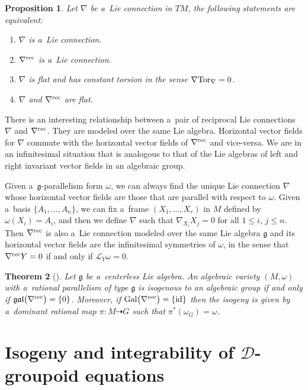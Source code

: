 \documentclass[10pt,a4paper]{amsart}
\numberwithin{equation}{section}
\newtheorem{Theorem}{Theorem}[section]
\newtheorem{Proposition}[Theorem]{Proposition}
\theoremstyle{definition}
\begin{document}
\begin{Proposition}
Let $\nabla$ be a~Lie connection in $TM$, the following statements are equivalent:
\begin{enumerate}\itemsep=0pt
 \item[$(1)$] $\nabla$ is a~Lie connection.
 \item[$(2)$] $\nabla^{\rm rec}$ is a~Lie connection.
 \item[$(3)$] $\nabla$ is flat and has constant torsion in the sense $\nabla {\rm Tor}_\nabla = 0$.
 \item[$(4)$] $\nabla$ and $\nabla^{\rm rec}$ are flat.
\end{enumerate}
\end{Proposition}

There is an interesting relationship between a~pair of reciprocal Lie connections $\nabla$ and $\nabla^{\rm rec}$. They are modeled over the same Lie algebra. Horizontal vector fields for $\nabla$ commute with the horizontal vector fields of $\nabla^{\rm rec}$ and vice-versa. We are in an infinitesimal situation that is analogous to that of the Lie algebras of left and right invariant vector fields in an algebraic group.

Given a~$\mathfrak g$-parallelism form $\omega$, we can always find the unique Lie connection $\nabla$ whose horizontal vector fields are those that are parallel with respect to $\omega$. Given a~basis $\{A_1,\dots,A_n\}$, we can fix a~frame $(X_1,\dots,X_r)$ in $M$ defined by $\omega(X_i)=A_i$, and then we define $\nabla$ such that $\nabla_{X_i}X_j = 0$ for all $1 \leq i$, $j \leq n$.
Then $\nabla^{\rm rec}$ is also a~Lie connection modeled over the same Lie algebra $\mathfrak g$ and its horizontal vector fields are the infinitesimal symmetries of $\omega$, in the sense that $\nabla^{\rm rec} Y = 0$ if and only if $\mathcal{L}_Y\omega = 0$.

\begin{Theorem}[{\cite[Corollary 4.3\,(a) and (d)]{bc2017}}]\label{thm:0}
Let $\mathfrak g$ be a~centerless Lie algebra. An algebraic variety $(M,\omega)$ with a~rational parallelism of type $\mathfrak g$ is isogenous to an algebraic group if and only if $\mathfrak{gal}\bigl(\nabla^{\rm rec}\bigr) = \{0\}$. Moreover, if ${\rm Gal}\bigl(\nabla^{\rm rec}\bigr) = \{ \rm id \}$ then the isogeny is given by a~dominant rational map $\pi\colon M \dasharrow G$ such that $\pi^*(\omega_G) = \omega$.
\end{Theorem}

\section[Isogeny and integrability of D-groupoid equations]{Isogeny and integrability of $\boldsymbol{\mathcal D}$-groupoid equations}
\end{document}
